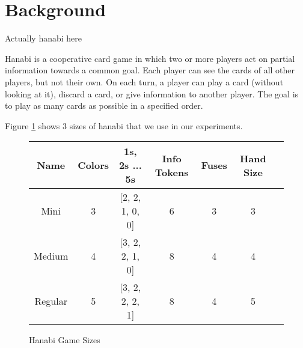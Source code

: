 \section{Background}
\label{background}

Actually hanabi here

Hanabi \cite{hanabiboardgame, hanabiwiki} is a cooperative card game in which two or more players act on partial information towards a common goal. Each player can see the cards of all other players, but not their own. On each turn, a player can play a card (without looking at it), discard a card, or give information to another player. The goal is to play as many cards as possible in a specified order.

Figure \ref{fig:hanabisizes} shows 3 sizes of hanabi that we use in our experiments.

\begin{figure}
    \centering
    \begin{tabular}{|c | c | c | c | c | c | c |} \hline
        Name        & Colors & 1s, 2s ... 5s  & Info Tokens & Fuses & Hand Size \\ \hline
        Mini        & 3      & [2, 2, 1, 0, 0]    & 6           & 3     & 3 \\ \hline
        Medium      & 4      & [3, 2, 2, 1, 0] & 8           & 4     & 4 \\ \hline
        Regular     & 5      & [3, 2, 2, 2, 1] & 8 & 4 & 5 \\ \hline
    \end{tabular}
    \caption{Hanabi Game Sizes}
    \label{fig:hanabisizes}
\end{figure}
